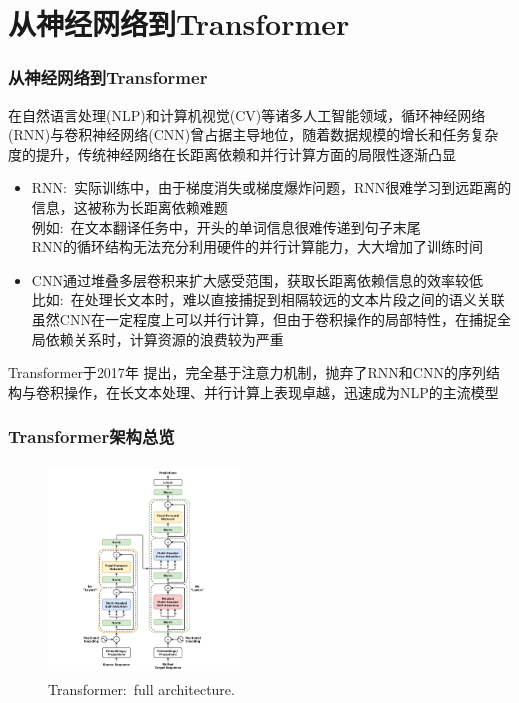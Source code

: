 \section{从神经网络到\rm{Transformer}}
\begin{frame}
	\frametitle{从神经网络到\textrm{Transformer}}
    在自然语言处理\textrm{(NLP)}和计算机视觉\textrm{(CV)}等诸多人工智能领域，循环神经网络\textrm{(RNN)}与卷积神经网络\textrm{(CNN)}曾占据主导地位，随着数据规模的增长和任务复杂度的提升，传统神经网络在长距离依赖和并行计算方面的局限性逐渐凸显
    \begin{itemize}
	    \item \textrm{RNN}:~实际训练中，由于梯度消失或梯度爆炸问题，RNN很难学习到远距离的信息，这被称为长距离依赖难题\\
		    例如:~在文本翻译任务中，开头的单词信息很难传递到句子末尾\\
		    \textrm{RNN}的循环结构无法充分利用硬件的并行计算能力，大大增加了训练时间
	    \item \textrm{CNN}通过堆叠多层卷积来扩大感受范围，获取长距离依赖信息的效率较低\\
		    比如:~在处理长文本时，难以直接捕捉到相隔较远的文本片段之间的语义关联\\
		    虽然\textrm{CNN}在一定程度上可以并行计算，但由于卷积操作的局部特性，在捕捉全局依赖关系时，计算资源的浪费较为严重
    \end{itemize}
    Transformer于\textrm{2017}年%
    提出，完全基于注意力机制，抛弃了\textrm{RNN}和\textrm{CNN}的序列结构与卷积操作，在长文本处理、并行计算上表现卓越，迅速成为\textrm{NLP}的主流模型
\end{frame}


\begin{frame}
	\frametitle{\textrm{Transformer}架构总览}
\begin{figure}[h!]
\centering
\includegraphics[height=2.2in, width=2.0in, viewport=300 0 1200 1500,clip]{Figures/Transformer_full_architecture.png}
\caption{\tiny \textrm{Transformer:~full architecture.}}%
\label{Transformer_full_architecture}
\end{figure}
\end{frame}

